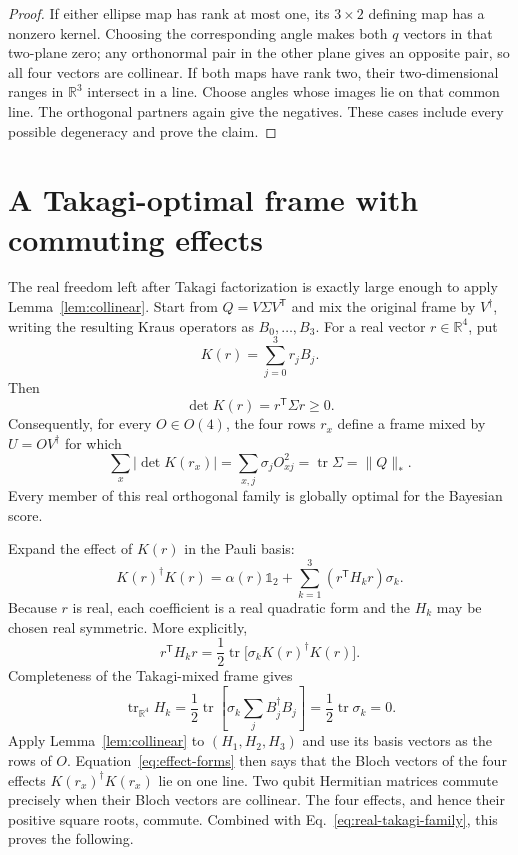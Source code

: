 \documentclass[11pt]{article}
\theoremstyle{remark}
\newcommand{\Tr}{\operatorname{tr}}
\newcommand{\R}{\mathbb{R}}
\newcommand{\one}{\mathbb{1}}
\begin{document}
\begin{proof}
If either ellipse map has rank at most one, its $3\times2$ defining map has a
nonzero kernel.  Choosing the corresponding angle makes both $q$ vectors in
that two-plane zero; any orthonormal pair in the other plane gives an opposite
pair, so all four vectors are collinear.  If both maps have rank two, their
two-dimensional ranges in $\R^3$ intersect in a line.  Choose angles whose
images lie on that common line.  The orthogonal partners again give the
negatives.  These cases include every possible degeneracy and prove the
claim.
\end{proof}

\section{A Takagi-optimal frame with commuting effects}
\label{sec:construction}

The real freedom left after Takagi factorization is exactly large enough to
apply Lemma~\ref{lem:collinear}.  Start from
$Q=V\Sigma V^{\mathsf T}$ and mix the original frame by $V^\dagger$, writing
the resulting Kraus operators as $B_0,\ldots,B_3$.  For a real vector
$r\in\R^4$, put
\begin{equation}
  K(r)=\sum_{j=0}^{3}r_jB_j .
\end{equation}
Then
\begin{equation}
  \det K(r)=r^{\mathsf T}\Sigma r\geq0.
  \label{eq:positive-det}
\end{equation}
Consequently, for every $O\in O(4)$, the four rows $r_x$ define a frame mixed
by $U=OV^\dagger$ for which
\begin{equation}
 \sum_x|\det K(r_x)|
 =\sum_{x,j}\sigma_jO_{xj}^2
 =\Tr\Sigma=\|Q\|_* .
 \label{eq:real-takagi-family}
\end{equation}
Every member of this real orthogonal family is globally optimal for the
Bayesian score.

Expand the effect of $K(r)$ in the Pauli basis:
\begin{equation}
 K(r)^\dagger K(r)
 =\alpha(r)\one_2+\sum_{k=1}^{3}(r^{\mathsf T}H_kr)\sigma_k .
 \label{eq:effect-forms}
\end{equation}
Because $r$ is real, each coefficient is a real quadratic form and the
$H_k$ may be chosen real symmetric.  More explicitly,
\begin{equation}
 r^{\mathsf T}H_kr=\frac12\Tr\bigl[\sigma_kK(r)^\dagger K(r)\bigr].
\end{equation}
Completeness of the Takagi-mixed frame gives
\begin{equation}
 \Tr_{\R^4}H_k
 =\frac12\Tr\!\left[\sigma_k\sum_jB_j^\dagger B_j\right]
 =\frac12\Tr\sigma_k=0 .
 \label{eq:traceless-forms}
\end{equation}
Apply Lemma~\ref{lem:collinear} to $(H_1,H_2,H_3)$ and use its basis vectors
as the rows of $O$.  Equation~\eqref{eq:effect-forms} then says that the Bloch
vectors of the four effects $K(r_x)^\dagger K(r_x)$ lie on one line.  Two
qubit Hermitian matrices commute precisely when their Bloch vectors are
collinear.  The four effects, and hence their positive square roots, commute.
Combined with Eq.~\eqref{eq:real-takagi-family}, this proves the following.
\end{document}
